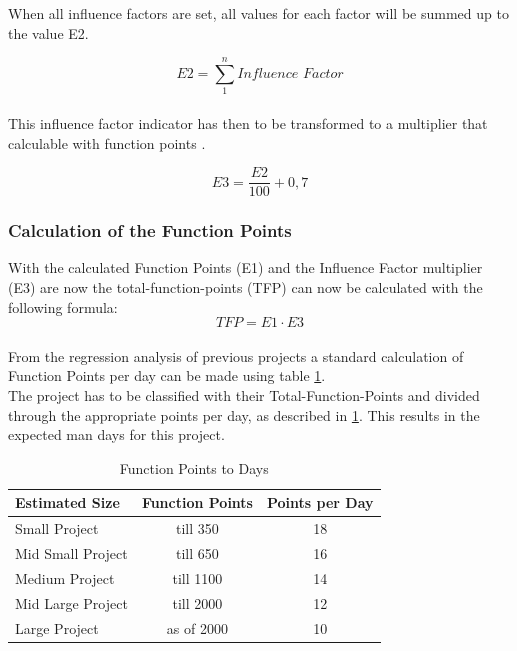 When all influence factors are set, all values for each factor will be summed up to the value E2. 

\begin{equation}
\textit{E2} =  \sum \limits_{1}^n   \textit{Influence Factor}  \label{fp:E2}
\end{equation}\\
This influence factor indicator has then to be transformed to a multiplier that calculable with function points \cite{Softwaremanagement}\cite{fpafundamentals}.  

\begin{equation}
	\textit{E3} =\frac{\textit{E2}}{100}  + 0,7 \label{fp:E3}
\end{equation}

\subsubsection{Calculation of the Function Points}

With the calculated Function Points (E1) and the Influence Factor multiplier (E3) are now the total-function-points (TFP) can now be calculated with the following formula:
\begin{equation}
	\textit{TFP} = \textit{E1} \cdot \textit{E3}  \label{fp:TFP}
\end{equation}\\
From the regression analysis of previous projects a standard calculation of Function Points per day can be made using table \ref{tab:pointsperday}.\\
The project has to be classified with their Total-Function-Points and divided through the appropriate points per day, as described in \ref{tab:pointsperday}. This results in the expected man days for this project.\\
\begin{table}[h] 
	\centering 
	\setlength{\tabcolsep}{4pt}
	\begin{tabular}{|l|c|c|}\hline
		Estimated Size    & Function Points & Points per Day\\ \hline
		Small Project     & till 350        & 18 \\ \hline
		Mid Small Project & till 650        & 16 \\ \hline
		Medium Project    & till 1100 		& 14 \\ \hline
		Mid Large Project & till 2000 		& 12\\ \hline
		Large Project     & as of 2000 		& 10 \\ \hline
	\end{tabular}
	\caption{Function Points to Days} 
	\label{tab:pointsperday} 
\end{table} 


